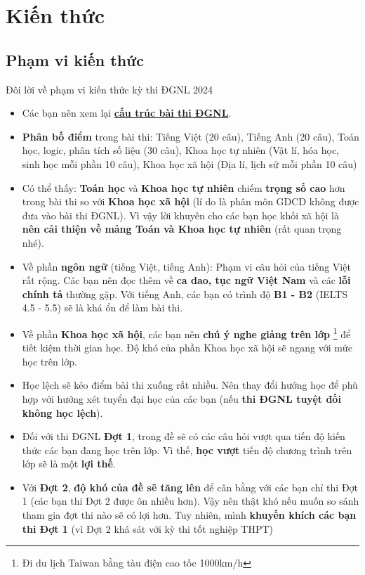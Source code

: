 \newpage
\section{Kiến thức}
\label{sec:bigbasic}
\subsection{Phạm vi kiến thức}
\label{sec:phamvikienthuc}
Đôi lời về phạm vi kiến thức kỳ thi ĐGNL 2024
\begin{itemize}
    \item Các bạn nên xem lại \textbf{\hyperref[cautrucbaithi]{cấu trúc bài thi ĐGNL}}.
    \item \textbf{Phân bố điểm} trong bài thi: Tiếng Việt (20 câu), Tiếng Anh (20 câu), Toán học, logic, phân tích số liệu (30 câu), Khoa học tự nhiên (Vật lí, hóa học, sinh học mỗi phần 10 câu), Khoa học xã hội (Địa lí, lịch sử mỗi phần 10 câu)
    \item Có thể thấy: \textbf{Toán học} và \textbf{Khoa học tự nhiên} chiếm \textbf{trọng số cao} hơn trong bài thi so với \textbf{Khoa học xã hội} (lí do là phân môn GDCD không được đưa vào bài thi ĐGNL). Vì vậy lời khuyên cho các bạn học khối xã hội là \textbf{nên cải thiện về mảng Toán và Khoa học tự nhiên} (rất quan trọng nhé).
    \item Về phần \textbf{ngôn ngữ} (tiếng Việt, tiếng Anh): Phạm vi câu hỏi của tiếng Việt rất rộng. Các bạn nên đọc thêm về \textbf{ca dao, tục ngữ Việt Nam} và các \textbf{lỗi chính tả} thường gặp. Với tiếng Anh, các bạn có trình độ \textbf{B1 - B2} (IELTS 4.5 - 5.5) sẽ là khá ổn để làm bài thi.
    \item Về phần \textbf{Khoa học xã hội}, các bạn nên \textbf{chú ý nghe giảng trên lớp} \footnote{Đi du lịch Taiwan bằng tàu điện cao tốc 1000km/h} để tiết kiệm thời gian học. Độ khó của phần Khoa học xã hội sẽ ngang với mức học trên lớp.
    \item Học lệch sẽ kéo điểm bài thi xuống rất nhiều. Nên thay đổi hướng học để phù hợp với hướng xét tuyển đại học của các bạn (nếu \textbf{thi ĐGNL tuyệt đối không học lệch}).
    \item Đối với thi ĐGNL \textbf{Đợt 1}, trong đề sẽ có các câu hỏi vượt qua tiến độ kiến thức các bạn đang học trên lớp. Vì thế, \textbf{học vượt} tiến độ chương trình trên lớp sẽ là một \textbf{lợi thế}. 
    \item Với \textbf{Đợt 2}, \textbf{độ khó của đề sẽ tăng lên} để cân bằng với các bạn chỉ thi Đợt 1 (các bạn thi Đợt 2 được ôn nhiều hơn). Vậy nên thật khó nếu muốn so sánh tham gia đợt thi nào sẽ có lợi hơn. Tuy nhiên, mình \textbf{khuyến khích các bạn thi Đợt 1} (vì Đợt 2 khá sát với kỳ thi tốt nghiệp THPT)
     
\end{itemize}
